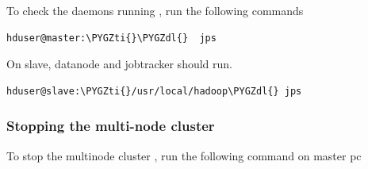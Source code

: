 \documentclass[letterpaper,10pt,english]{sphinxmanual}
\def\PYGZdl{\char`\$}
\def\PYGZti{\char`\~}
\begin{document}
To check the daemons running , run the following commands

\begin{Verbatim}[commandchars=\\\{\}]
hduser@master:\PYGZti{}\PYGZdl{}  jps
\end{Verbatim}
\begin{figure}[htbp]
\centering

\end{figure}

On slave, datanode and jobtracker should run.

\begin{Verbatim}[commandchars=\\\{\}]
hduser@slave:\PYGZti{}/usr/local/hadoop\PYGZdl{} jps
\end{Verbatim}
\begin{figure}[htbp]
\centering

\end{figure}


\subsubsection{Stopping the multi-node cluster}
\label{hadoop:stopping-the-multi-node-cluster}
To stop the multinode cluster , run the following command on master pc
\end{document}
